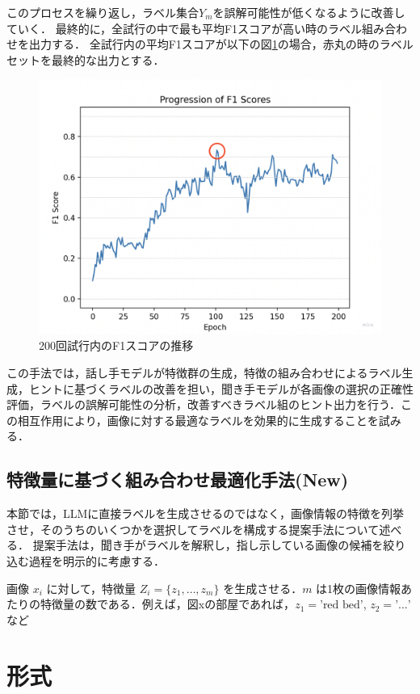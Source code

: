 \documentclass[a4paper,11pt]{jreport}
\begin{document}
このプロセスを繰り返し，ラベル集合$Y_m$を誤解可能性が低くなるように改善していく．
最終的に，全試行の中で最も平均F1スコアが高い時のラベル組み合わせを出力する．
全試行内の平均F1スコアが以下の図\ref{fig:f1_score}の場合，赤丸の時のラベルセットを最終的な出力とする．
\begin{figure}[H]
  \centering
  \includegraphics[width=\linewidth]{figures/f1_score.png}
  \caption{200回試行内のF1スコアの推移}
  \label{fig:f1_score}
\end{figure}
この手法では，話し手モデルが特徴群の生成，特徴の組み合わせによるラベル生成，ヒントに基づくラベルの改善を担い，聞き手モデルが各画像の選択の正確性評価，ラベルの誤解可能性の分析，改善すべきラベル組のヒント出力を行う．この相互作用により，画像に対する最適なラベルを効果的に生成することを試みる．

\section{特徴量に基づく組み合わせ最適化手法(New)}
本節では，LLMに直接ラベルを生成させるのではなく，画像情報の特徴を列挙させ，そのうちのいくつかを選択してラベルを構成する提案手法について述べる．
提案手法は，聞き手がラベルを解釈し，指し示している画像の候補を絞り込む過程を明示的に考慮する．

画像 $x_i$ に対して，特徴量 $Z_i = \{z_1, \ldots, z_m\}$ を生成させる．$m$ は1枚の画像情報あたりの特徴量の数である．例えば，図xの部屋であれば，$z_1 = \text{'red bed'}$, $z_2 = \text{'...'}$ など


\chapter{形式}
\end{document}
